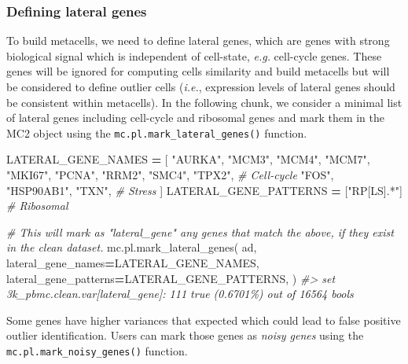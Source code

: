 \documentclass[
]{book}
\newenvironment{Shaded}{\begin{snugshade}}{\end{snugshade}}
\newcommand{\CommentTok}[1]{\textcolor[rgb]{0.56,0.35,0.01}{\textit{#1}}}
\newcommand{\NormalTok}[1]{#1}
\newcommand{\OperatorTok}[1]{\textcolor[rgb]{0.81,0.36,0.00}{\textbf{#1}}}
\newcommand{\StringTok}[1]{\textcolor[rgb]{0.31,0.60,0.02}{#1}}
\begin{document}
\hypertarget{defining-lateral-genes}{%
\subsubsection*{Defining lateral genes}\label{defining-lateral-genes}}

To build metacells, we need to define lateral genes, which are genes with strong biological signal which is independent of cell-state, \emph{e.g.} cell-cycle genes.
These genes will be ignored for computing cells similarity and build metacells
but will be considered to define outlier cells (\emph{i.e.}, expression levels of lateral genes should be consistent within metacells).
In the following chunk, we consider a minimal list of lateral genes including cell-cycle and ribosomal genes and mark them in the MC2 object using the \texttt{mc.pl.mark\_lateral\_genes()} function.

\begin{Shaded}
\begin{Highlighting}[]

\NormalTok{LATERAL\_GENE\_NAMES }\OperatorTok{=}\NormalTok{ [}
    \StringTok{"AURKA"}\NormalTok{, }\StringTok{"MCM3"}\NormalTok{, }\StringTok{"MCM4"}\NormalTok{, }\StringTok{"MCM7"}\NormalTok{, }\StringTok{"MKI67"}\NormalTok{, }\StringTok{"PCNA"}\NormalTok{, }\StringTok{"RRM2"}\NormalTok{, }\StringTok{"SMC4"}\NormalTok{, }\StringTok{"TPX2"}\NormalTok{,  }\CommentTok{\# Cell{-}cycle}
    \StringTok{"FOS"}\NormalTok{, }\StringTok{"HSP90AB1"}\NormalTok{, }\StringTok{"TXN"}\NormalTok{,                                                  }\CommentTok{\# Stress}
\NormalTok{]}
\NormalTok{LATERAL\_GENE\_PATTERNS }\OperatorTok{=}\NormalTok{ [}\StringTok{"RP[LS].*"}\NormalTok{]  }\CommentTok{\# Ribosomal}

\CommentTok{\# This will mark as "lateral\_gene" any genes that match the above, if they exist in the clean dataset.}
\NormalTok{mc.pl.mark\_lateral\_genes(}
\NormalTok{    ad,}
\NormalTok{    lateral\_gene\_names}\OperatorTok{=}\NormalTok{LATERAL\_GENE\_NAMES,}
\NormalTok{    lateral\_gene\_patterns}\OperatorTok{=}\NormalTok{LATERAL\_GENE\_PATTERNS,}
\NormalTok{)}
\CommentTok{\#\textgreater{} set 3k\_pbmc.clean.var[lateral\_gene]: 111 true (0.6701\%) out of 16564 bools}
\end{Highlighting}
\end{Shaded}

Some genes have higher variances that expected which could lead to false positive outlier identification.
Users can mark those genes as \emph{noisy genes} using the \texttt{mc.pl.mark\_noisy\_genes()} function.
\end{document}
